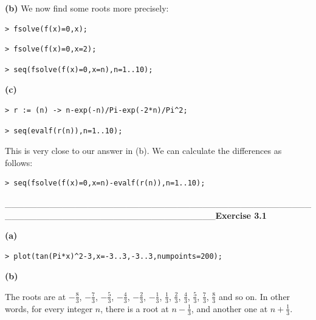 \documentclass{article}
\begin{document}
\textbf{(b)} We now find some roots more precisely:\begin{lstlisting}
> fsolve(f(x)=0,x);
\end{lstlisting}
\begin{lstlisting}
> fsolve(f(x)=0,x=2);
\end{lstlisting}
\begin{lstlisting}
> seq(fsolve(f(x)=0,x=n),n=1..10);
\end{lstlisting}
\begin{Maple Normal}
\textbf{(c)}
\end{Maple Normal}
\begin{lstlisting}
> r := (n) -> n-exp(-n)/Pi-exp(-2*n)/Pi^2;
\end{lstlisting}
\begin{lstlisting}
> seq(evalf(r(n)),n=1..10);
\end{lstlisting}
This is very close to our answer in (b).  We can calculate the differences as follows:\begin{lstlisting}
> seq(fsolve(f(x)=0,x=n)-evalf(r(n)),n=1..10);
\end{lstlisting}
\_\_\_\_\_\_\_\_\_\_\_\_\_\_\_\_\_\_\_\_\_\_\_\_\_\_\_\_\_\_\_\_\_\_\_\_\_\_\_\_\_\_\_\_\_\_\_\_\_\_\_\_\_\_\_\_\_\_\_\_\_\_\_\_\_\_\_\_\_\_\_\_\_\_\_\_\_\_\_\_\_\textbf{Exercise 3.1}\begin{Maple Normal}
\textbf{(a)}
\end{Maple Normal}
\begin{lstlisting}
> plot(tan(Pi*x)^2-3,x=-3..3,-3..3,numpoints=200);
\end{lstlisting}
\begin{Maple Normal}
\textbf{(b)}
\end{Maple Normal}
The roots are at 
$ -\frac{8}{3} $,  
$ -\frac{7}{3} $,  
$ -\frac{5}{3} $,  
$ -\frac{4}{3} $,  
$ -\frac{2}{3} $,  
$ -\frac{1}{3} $,  
$ \frac{1}{3} $,  
$ \frac{2}{3} $,  
$ \frac{4}{3} $,  
$ \frac{5}{3} $,  
$ \frac{7}{3} $,  
$ \frac{8}{3} $ and so on.  In other words, for every integer 
$ n  $, there is a root at 
$ n -\frac{1}{3} $, and another one at 
$ n +\frac{1}{3} $.\
\end{document}
